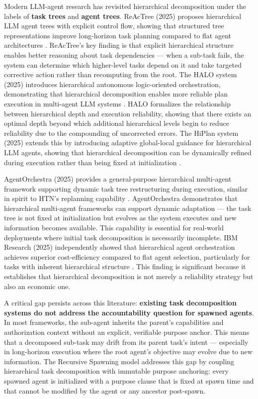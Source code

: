 Modern LLM-agent research has revisited hierarchical decomposition under the labels of \textbf{task trees} and \textbf{agent trees}. ReAcTree (2025) proposes hierarchical LLM agent trees with explicit control flow, showing that structured tree representations improve long-horizon task planning compared to flat agent architectures \cite{reactree2025}. ReAcTree's key finding is that explicit hierarchical structure enables better reasoning about task dependencies — when a sub-task fails, the system can determine which higher-level tasks depend on it and take targeted corrective action rather than recomputing from the root. The HALO system (2025) introduces hierarchical autonomous logic-oriented orchestration, demonstrating that hierarchical decomposition enables more reliable plan execution in multi-agent LLM systems \cite{halo2025}. HALO formalizes the relationship between hierarchical depth and execution reliability, showing that there exists an optimal depth beyond which additional hierarchical levels begin to reduce reliability due to the compounding of uncorrected errors. The HiPlan system (2025) extends this by introducing adaptive global-local guidance for hierarchical LLM agents, showing that hierarchical decomposition can be dynamically refined during execution rather than being fixed at initialization \cite{hiplan2025arxiv}.

AgentOrchestra (2025) provides a general-purpose hierarchical multi-agent framework supporting dynamic task tree restructuring during execution, similar in spirit to HTN's replanning capability \cite{agentorchestra2025}. AgentOrchestra demonstrates that hierarchical multi-agent frameworks can support dynamic adaptation — the task tree is not fixed at initialization but evolves as the system executes and new information becomes available. This capability is essential for real-world deployments where initial task decomposition is necessarily incomplete. IBM Research (2025) independently showed that hierarchical agent orchestration achieves superior cost-efficiency compared to flat agent selection, particularly for tasks with inherent hierarchical structure \cite{ibm2025hierarchical}. This finding is significant because it establishes that hierarchical decomposition is not merely a reliability strategy but also an economic one.

A critical gap persists across this literature: \textbf{existing task decomposition systems do not address the accountability question for spawned agents}. In most frameworks, the sub-agent inherits the parent's capabilities and authorization context without an explicit, verifiable purpose anchor. This means that a decomposed sub-task may drift from its parent task's intent — especially in long-horizon execution where the root agent's objective may evolve due to new information. The Recursive Spawning model addresses this gap by coupling hierarchical task decomposition with immutable purpose anchoring: every spawned agent is initialized with a purpose clause that is fixed at spawn time and that cannot be modified by the agent or any ancestor post-spawn.

